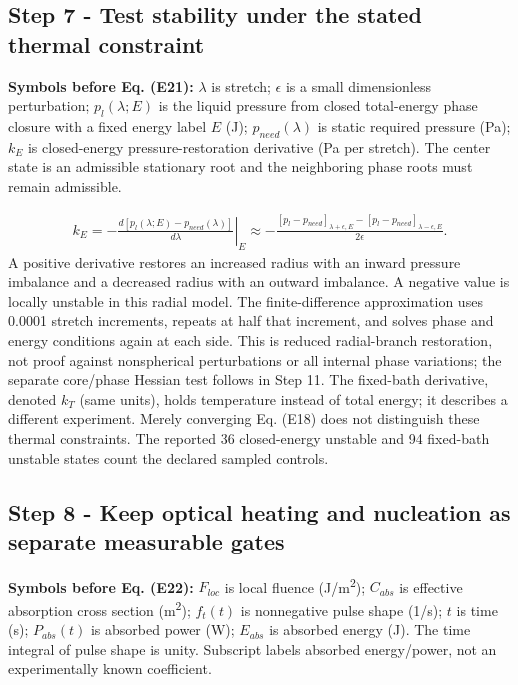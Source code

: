 \documentclass[10pt,a4paper]{article}
\begin{document}
\subsection*{Step 7  -  Test stability under the stated thermal constraint}
\textbf{Symbols before Eq. (E21):} $\lambda$ is stretch; $\epsilon$ is a small dimensionless perturbation; $p_l(\lambda;E)$ is the liquid pressure from closed total-energy phase closure with a fixed energy label $E$ (J); $p_{need}(\lambda)$ is static required pressure (Pa); $k_E$ is closed-energy pressure-restoration derivative (Pa per stretch). The center state is an admissible stationary root and the neighboring phase roots must remain admissible.

{\small\begin{align*}
k_E=-\left.\frac{d[p_l(\lambda;E)-p_{need}(\lambda)]}{d\lambda}\right|_E
\approx-\frac{[p_l-p_{need}]_{\lambda+\epsilon,E}-[p_l-p_{need}]_{\lambda-\epsilon,E}}{2\epsilon}. \tag{E21}
\end{align*}}
A positive derivative restores an increased radius with an inward pressure imbalance and a decreased radius with an outward imbalance. A negative value is locally unstable in this radial model. The finite-difference approximation uses 0.0001 stretch increments, repeats at half that increment, and solves phase and energy conditions again at each side. This is reduced radial-branch restoration, not proof against nonspherical perturbations or all internal phase variations; the separate core/phase Hessian test follows in Step 11. The fixed-bath derivative, denoted $k_T$ (same units), holds temperature instead of total energy; it describes a different experiment. Merely converging Eq. (E18) does not distinguish these thermal constraints. The reported 36 closed-energy unstable and 94 fixed-bath unstable states count the declared sampled controls.

\subsection*{Step 8  -  Keep optical heating and nucleation as separate measurable gates}
\textbf{Symbols before Eq. (E22):} $F_{loc}$ is local fluence (J/m\textsuperscript{2}); $C_{abs}$ is effective absorption cross section (m\textsuperscript{2}); $f_t(t)$ is nonnegative pulse shape (1/s); $t$ is time (s); $P_{abs}(t)$ is absorbed power (W); $E_{abs}$ is absorbed energy (J). The time integral of pulse shape is unity. Subscript  labels absorbed energy/power, not an experimentally known coefficient.
\end{document}
